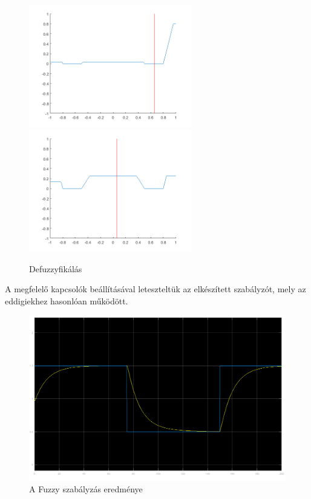 \begin{figure}[!h]
	\centering
	\includegraphics[width=71mm, keepaspectratio]{figures/m01/matlab2.png}\hspace{5mm}
	\includegraphics[width=71mm, keepaspectratio]{figures/m01/matlab3.png}
	\caption{Defuzzyfikálás} 
	\label{fig:MatlabFuzzy}
\end{figure}
A megfelelő kapcsolók beállításával leteszteltük az elkészített szabályzót, mely az eddigiekhez hasonlóan működött.

\begin{figure}
\centering
\includegraphics[width=131mm, keepaspectratio]{figures/m01/matlab1.png}
\caption{A Fuzzy szabályzás eredménye} 
\label{fig:MatlabFuzzyResults}
\end{figure}
